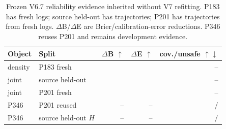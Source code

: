\begin{table}[t]
  \centering
  \caption{Frozen V6.7 reliability evidence inherited without V7 refitting. P183 has \PrelMarginalFreshLogs{} fresh logs;
  source held-out has \PrelJointDevTrajectories{} trajectories; P201 has \PrelJointFreshTrajectories{} trajectories from
  \PrelJointFreshLogs{} fresh logs. $\Delta$B/$\Delta$E are Brier/calibration-error reductions. P346 reuses P201 and remains
  development evidence.}
  \label{tab:c3-reliability}
  \scriptsize
  \setlength{\tabcolsep}{2.1pt}
  \begin{tabular}{llrrr}
    \toprule
    Object & Split & $\Delta$B $\uparrow$ & $\Delta$E $\uparrow$ & cov./unsafe $\uparrow\!\downarrow$ \\
    \midrule
    density & P183 fresh & \PrelMarginalBrierGain{} & \PrelMarginalCalibGain{} & -- \\
    joint & source held-out & \PrelJointDevBrierGain{} & \PrelJointDevCalibGain{} & -- \\
    joint & P201 fresh & \PrelJointFreshBrierGain{} & \PrelJointFreshCalibGain{} & -- \\
    P346 & P201 reused & -- & -- & \PrelAuthorityFreshCoverage{}/\PrelAuthorityFreshUnsafe{} \\
    P346 & source held-out $H$ & -- & -- & \PrelAuthorityHeldoutCoverage{}/\PrelAuthorityHeldoutUnsafe{} \\
    \bottomrule
  \end{tabular}
\end{table}
